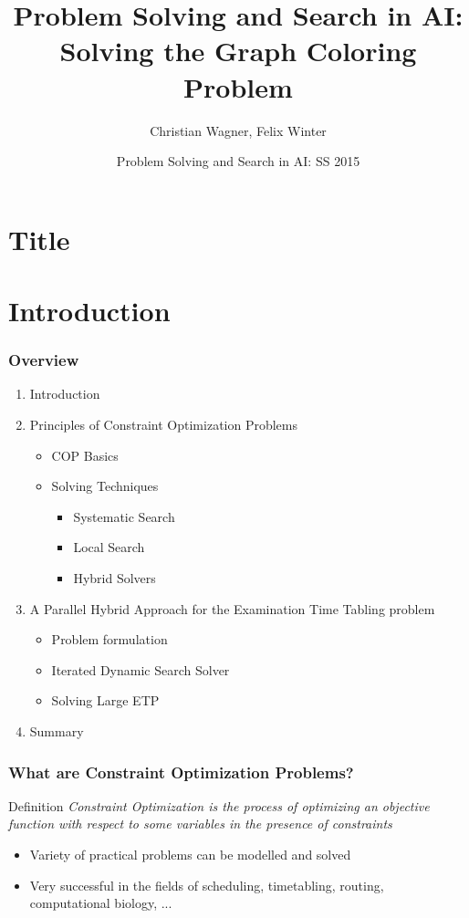 \documentclass{beamer}
\title[Solving the Graph Coloring Problem] %
{Problem Solving and Search in AI: Solving the Graph Coloring
Problem}
\author{Christian Wagner, Felix Winter}
\institute
{
  TU Wien  
}
\date[SS 2015] %
{Problem Solving and Search in AI: SS 2015}
\begin{document}
\section{Title}
  \frame{\titlepage}


\section{Introduction}

  \begin{frame}
    \frametitle{Overview}

    \begin{enumerate}
      \item Introduction
      \item Principles of Constraint Optimization Problems
      \begin{itemize}
        \item COP Basics
        \item Solving Techniques
        \begin{itemize}
          \item{Systematic Search}
          \item{Local Search}
          \item{Hybrid Solvers}
        \end{itemize}
      \end{itemize}
        \item{A Parallel Hybrid Approach for the Examination Time Tabling problem}
         \begin{itemize}
           \item{Problem formulation}
           \item{Iterated Dynamic Search Solver}
           \item{Solving Large ETP}
         \end{itemize}
       \item Summary

    \end{enumerate}
  \end{frame}


  \begin{frame}
    \frametitle{What are Constraint Optimization Problems?}

      \begin{exampleblock}{Definition}
        \emph{Constraint Optimization is the process of optimizing an objective function with respect to some variables in the presence of constraints}
      \end{exampleblock}

      \begin{itemize}
        \item{Variety of practical problems can be modelled and solved}
        \item{Very successful in the fields of scheduling, timetabling, routing, computational biology, ...}
      \end{itemize}
  \end{frame}
\end{document}
